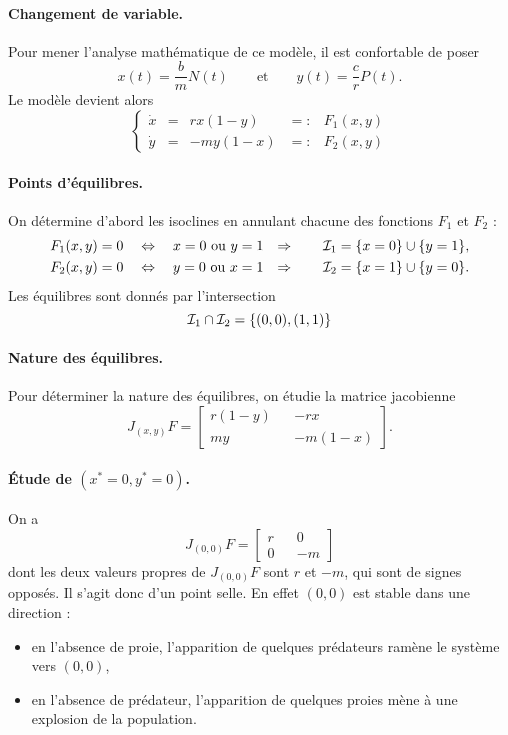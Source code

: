 \paragraph{Changement de variable.}
Pour mener l'analyse mathématique de ce modèle, il est confortable de poser
$$
x(t) = \frac{b}m N(t)
\qquad \text{et} \qquad
y(t) = \frac{c}r P(t).
$$
Le modèle devient alors
$$
\left\{\begin{array}{rcrcl} 
  \dot x & = & r x (1-y) & =: & F_1(x, y) \\
  \dot y & = & -m y (1-x) & =: & F_2(x, y)
\end{array}\right.
$$

\paragraph{Points d'équilibres.}
On détermine d'abord les isoclines en annulant chacune des fonctions $F_1$ et $F_2$ :
\begin{align*}
  F_1(x, y) & = 0 \quad \Leftrightarrow \quad x = 0 \text{ ou } y = 1 &
  \Rightarrow \qquad \mathcal{I}_1 & = \{x = 0\} \cup \{y = 1\}, \\
  F_2(x, y) & = 0 \quad \Leftrightarrow \quad y = 0 \text{ ou } x = 1 &
  \Rightarrow \qquad \mathcal{I}_2 & = \{x = 1\} \cup \{y = 0\}.
\end{align*}
Les équilibres sont donnés par l'intersection 
$$
\mathcal{I}_1 \cap \mathcal{I}_2 = \{(0, 0), (1, 1)\}
$$

\paragraph{Nature des équilibres.}
Pour déterminer la nature des équilibres, on étudie la matrice jacobienne
$$
J_{(x, y)}F = 
  \left[\begin{array}{ccc} 
    r (1-y) & & -r x \\
    m y & & -m (1-x)
  \end{array}\right].
$$

\paragraph{\'Etude de $(x^* = 0, y^* = 0)$.}
On a 
$$
J_{(0, 0)}F = 
  \left[\begin{array}{ccc} 
    r  & & 0 \\
    0 & & -m 
  \end{array}\right]
$$
dont les deux valeurs propres de $J_{(0, 0)}F$ sont $r$ et $-m$, qui sont de signes opposés. Il s'agit donc d'un point selle. En effet $(0, 0)$ est stable dans une direction : 
\begin{itemize}
  \item en l'absence de proie, l'apparition de quelques prédateurs ramène le système vers $(0, 0)$, 
  \item en l'absence de prédateur, l'apparition de quelques proies mène à une explosion de la population.
\end{itemize}
  
